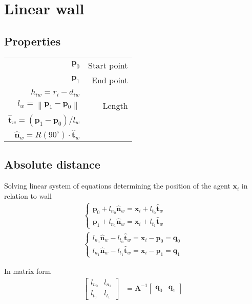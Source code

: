 \section{Linear wall}
\subsection{Properties}
\begin{table}[H]
\begin{tabularx}{1.0\linewidth}{ R R }
\hline
\hline
$ \mathbf{p}_{0} $ & Start point \\
$ \mathbf{p}_{1} $ & End point \\
\hline
\hline
$ h_{iw} = r_{i} - d_{iw} $ & \\
$ l_{w} = \left\|\mathbf{p}_{1} - \mathbf{p}_{0}\right\| $ & Length \\
$ \hat{\mathbf{t}}_{w} = \left(\mathbf{p}_{1} - \mathbf{p}_{0}\right) / l_{w} $ & \\
$ \hat{\mathbf{n}}_{w} = R(90^{\circ}) \cdot \hat{\mathbf{t}}_{w} $ & \\
\hline
\hline
\end{tabularx}
\end{table}

\subsection{Absolute distance}
Solving linear system of equations determining the position of the agent $ \mathbf{x}_{i} $ in relation to wall
\begin{align}
\begin{cases}
\mathbf{p}_{0} + l_{n_0} \hat{\mathbf{n}}_{w} = \mathbf{x}_{i} + l_{t_0} \hat{\mathbf{t}}_{w} \\
\mathbf{p}_{1} + l_{n_1} \hat{\mathbf{n}}_{w} = \mathbf{x}_{i} + l_{t_1} \hat{\mathbf{t}}_{w}
\end{cases} 
\\
\begin{cases}
l_{n_0} \hat{\mathbf{n}}_{w} - l_{t_0} \hat{\mathbf{t}}_{w} = \mathbf{x}_{i} - \mathbf{p}_{0} =  \mathbf{q}_{0} \\
l_{n_1} \hat{\mathbf{n}}_{w} - l_{t_1} \hat{\mathbf{t}}_{w} = \mathbf{x}_{i} - \mathbf{p}_{1} = \mathbf{q}_{1}
\end{cases}
\end{align}

In matrix form
\begin{align}
\begin{bmatrix} l_{n_0} & l_{n_1} \\ l_{t_0} & l_{t_1} \end{bmatrix} &= \mathbf{A}^{-1} \begin{bmatrix} \mathbf{q}_{0} & \mathbf{q}_{1} \end{bmatrix}
\end{align}

